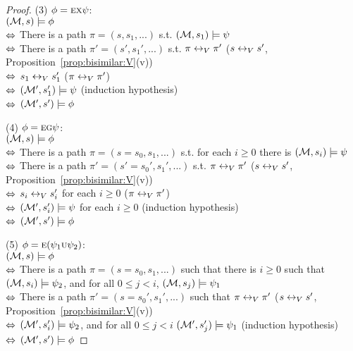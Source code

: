 \documentclass[twoside,11pt]{article}
\begin{document}
\begin{proof}
		(3) $\phi = \textsc{e} \textsc{x} \psi$:\\
		$({\cal M}, s) \models \phi$ \\
		$\Leftrightarrow$ There is a path $\pi = (s, s_1, ...)$ s.t.  $({\cal M}, s_1) \models \psi$\\
		$\Leftrightarrow$ There is a path $\pi' = (s', s_1', ...)$ s.t.  $\pi \leftrightarrow_V \pi'$ \hfill   ($s \leftrightarrow_V s'$, Proposition~\ref{prop:bisimilar:V}(v))\\
		$\Leftrightarrow$ $s_1 \leftrightarrow_V s_1'$  \hfill ($\pi \leftrightarrow_V \pi'$)\\
		$\Leftrightarrow$ $({\cal M}', s_1') \models \psi$  \hfill  (induction hypothesis)\\
		$\Leftrightarrow$ $({\cal M}', s') \models \phi$
		
		(4) $\phi = \textsc{e} \textsc{g} \psi$:\\
		$({\cal M}, s) \models \phi$ \\
		$\Leftrightarrow$ There is a path $\pi =(s=s_0, s_1, ...)$ s.t.  for each $i \geq 0$ there is $({\cal M}, s_i) \models \psi$\\
		$\Leftrightarrow$ There is a path $\pi' = (s'=s_0', s_1', ...)$ s.t.  $\pi \leftrightarrow_V \pi'$   \hfill ($s \leftrightarrow_V s'$, Proposition~\ref{prop:bisimilar:V}(v))\\
		$\Leftrightarrow$ $s_i \leftrightarrow_V s_i'$ for each $i \geq 0$ \hfill ($\pi \leftrightarrow_V \pi'$)\\
		$\Leftrightarrow$ $({\cal M}', s_i') \models \psi$ for each $i \geq 0$  \hfill  (induction hypothesis)\\
		$\Leftrightarrow$ $({\cal M}', s') \models \phi$
		
		(5) $\phi = \textsc{e} (\psi_1 \textsc{u} \psi_2)$:\\
		$({\cal M}, s) \models \phi$ \\
		$\Leftrightarrow$ There is a path $\pi= (s=s_0, s_1, ...)$ such that there is $i \geq 0$ such that $({\cal M}, s_i) \models \psi_2$, and for all $0 \leq j < i$, $({\cal M}, s_j) \models \psi_1$\\
		$\Leftrightarrow$ There is a path $\pi' = (s=s_0', s_1', ...)$ such that $\pi \leftrightarrow_V \pi'$  \hfill  ($s \leftrightarrow_V s'$, Proposition~\ref{prop:bisimilar:V}(v))\\
		$\Leftrightarrow$ $({\cal M}', s_i') \models \psi_2$, and for all $0 \leq j < i$ $({\cal M}', s_j') \models \psi_1$   \hfill   (induction hypothesis)\\
		$\Leftrightarrow$ $({\cal M}', s') \models \phi$
	\end{proof}
	
\end{document}
